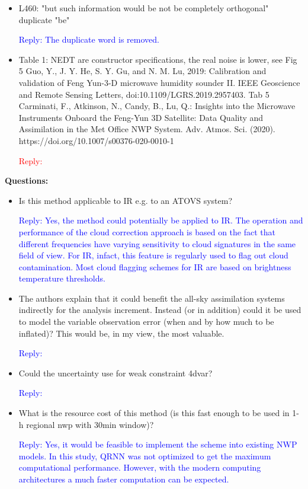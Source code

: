 \documentclass[11pt,a4paper,draft]{article}
\begin{document}
\begin{itemize}
		
\item	L460: "but such information would be not be completely orthogonal" duplicate "be"
		
\textcolor{blue}{Reply: The duplicate word is removed. }
		
		
		
\item	
		Table 1: NEDT are constructor specifications, the real noise is lower, see
		Fig 5 Guo, Y., J. Y. He, S. Y. Gu, and N. M. Lu, 2019: Calibration and validation of
		Feng Yun-3-D microwave humidity sounder II. IEEE Geoscience and Remote Sensing
		Letters, doi:10.1109/LGRS.2019.2957403.	Tab 5 Carminati, F., Atkinson, N., Candy, B., Lu, Q.: Insights into the Microwave Instruments Onboard the Feng-Yun 3D Satellite: Data Quality and Assimilation in the Met Office NWP System. Adv. Atmos. Sci. (2020). https://doi.org/10.1007/s00376-020-0010-1
	
\textcolor{red}{Reply:  }
		
\end{itemize}

		
		
		\textbf{Questions:}
		\newline
\begin{itemize}
		
\item	
		Is this method applicable to IR e.g. to an ATOVS system?
	
\textcolor{blue}{Reply:  Yes, the method could potentially be applied to IR. The operation and  performance of the cloud correction approach is based on the fact that different frequencies have varying sensitivity to cloud signatures in the same field of view. For IR, infact, this feature is regularly used to flag out cloud contamination. Most cloud flagging schemes for IR are based on brightness temperature thresholds.
}

\item 		
		The authors explain that it could benefit the all-sky assimilation systems indirectly for
		the analysis increment. Instead (or in addition) could it be used to model the variable
		observation error (when and by how much to be inflated)? This would be, in my view,
		the most valuable.	
			
\textcolor{blue}{Reply: }
		
\item	Could the uncertainty use for weak constraint 4dvar?
		
\textcolor{blue}{Reply:}
		
		
		
\item	
		What is the resource cost of this method (is this fast enough to be used in 1-h regional
		nwp with 30min window)?
	
\textcolor{blue}{Reply:  Yes, it would be feasible to implement the scheme into existing NWP models. In this study, QRNN was not optimized to get the maximum computational performance. However, with the modern computing architectures a much faster computation can be expected. }
		
\end{itemize}		

	
	
\end{document}
